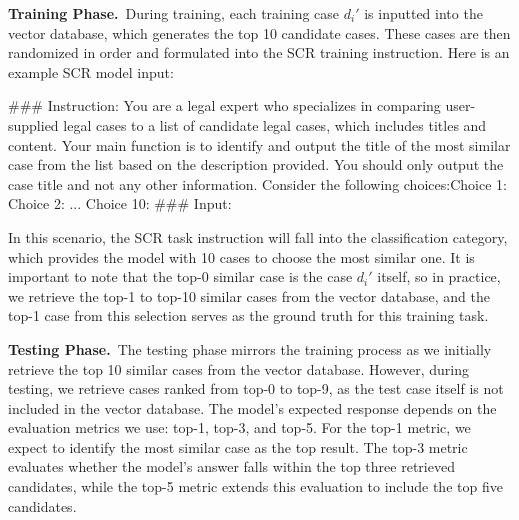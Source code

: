 \vspace{3pt}\noindent\textbf{Training Phase.}\, During training, each training case \(d_i' \) is inputted into the vector database, which generates the top 10 candidate cases. These cases are then randomized in order and formulated into the SCR training instruction. Here is an example SCR model input:

\begin{formal}
\#\#\# Instruction:\newline
You are a legal expert who specializes in comparing user-supplied legal cases to a list of candidate legal cases, which includes titles and content. Your main function is to identify and output the title of the most similar case from the list based on the description provided. \newline
You should only output the case title and not any other information. \newline
Consider the following choices:\newline Choice 1: \newline [Case 1...] \newline Choice 2: \newline ... \newline  Choice 10: \newline [Case 10...]\newline
\#\#\# Input:
\end{formal}

In this scenario, the SCR task instruction will fall into the classification category, which provides the model with 10 cases to choose the most similar one. It is important to note that the top-0 similar case is the case $d_i'$ itself, so in practice, we retrieve the top-1 to top-10 similar cases from the vector database, and the top-1 case from this selection serves as the ground truth for this training task.

\vspace{3pt}\noindent\textbf{Testing Phase.}\, 
The testing phase mirrors the training process as we initially retrieve the top 10 similar cases from the vector database. However, during testing, we retrieve cases ranked from top-0 to top-9, as the test case itself is not included in the vector database. The model's expected response depends on the evaluation metrics we use: top-1, top-3, and top-5. For the top-1 metric, we expect \sysname to identify the most similar case as the top result. The top-3 metric evaluates whether the model's answer falls within the top three retrieved candidates, while the top-5 metric extends this evaluation to include the top five candidates. 

